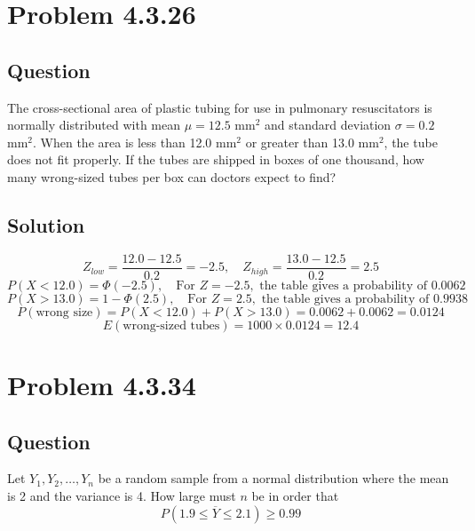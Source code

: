 \documentclass[12pt]{article}
\begin{document}
\newpage

\section*{Problem 4.3.26}
\subsection*{Question}
The cross-sectional area of plastic tubing for use in pulmonary resuscitators is normally distributed with mean \( \mu = 12.5 \) mm\(^2\) and standard deviation \( \sigma = 0.2 \) mm\(^2\). When the area is less than 12.0 mm\(^2\) or greater than 13.0 mm\(^2\), the tube does not fit properly. If the tubes are shipped in boxes of one thousand, how many wrong-sized tubes per box can doctors expect to find?

\subsection*{Solution}
\[
Z_{low} = \frac{12.0 - 12.5}{0.2} = -2.5, \quad Z_{high} = \frac{13.0 - 12.5}{0.2} = 2.5
\]
\[
P(X < 12.0) = \Phi(-2.5), \quad \text{For } Z = -2.5, \text{ the table gives a probability of } 0.0062
\]
\[
P(X > 13.0) = 1 - \Phi(2.5), \quad \text{For } Z = 2.5, \text{ the table gives a probability of } 0.9938
\]
\[
P(\text{wrong size}) = P(X < 12.0) + P(X > 13.0) = 0.0062 + 0.0062 = 0.0124
\]
\[
E(\text{wrong-sized tubes}) = 1000 \times 0.0124 = 12.4
\]


\newpage
\section*{Problem 4.3.34}
\subsection*{Question}
Let \( Y_1, Y_2, \ldots, Y_n \) be a random sample from a normal distribution where the mean is 2 and the variance is 4. How large must \( n \) be in order that 
\[ P(1.9 \leq \overline{Y} \leq 2.1) \geq 0.99 \]
\end{document}

